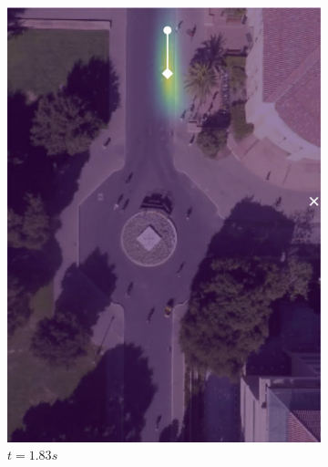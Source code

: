 \documentclass[letterpaper,10pt,conference]{ieeeconf}
\begin{document}
\begin{figure}
	\centering
	\begin{subfigure}[b]{.45\linewidth}
		\includegraphics[width=\linewidth]{./figures/FirstPage/gates_1_2_t=55.jpg}
		\caption{$t=1.83s$}
	\end{subfigure}
		\begin{subfigure}[b]{.45\linewidth}

\end{subfigure}
\end{figure}
\end{document}
